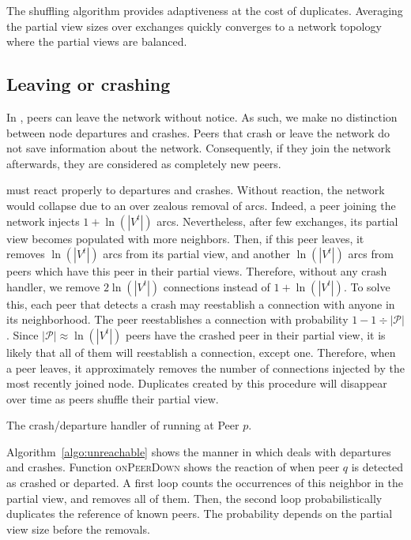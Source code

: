The shuffling algorithm provides adaptiveness at the cost of
duplicates. Averaging the partial view sizes over exchanges quickly
converges to a network topology where the partial views are balanced.

\subsection{Leaving or crashing}
\label{subsec:leaving}

In \SPRAY, peers can leave the network without notice. As such, we make no
distinction between node departures and crashes. Peers that crash or leave the
network do not save information about the network. Consequently, if they join
the network afterwards, they are considered as completely new peers.

\SPRAY must react properly to departures and crashes. Without reaction, the
network would collapse due to an over zealous removal of arcs. Indeed, a peer
joining the network injects $1+\ln(|V^t|)$ arcs. Nevertheless, after few
exchanges, its partial view becomes populated with more neighbors. Then, if this
peer leaves, it removes $\ln(|V^t|)$ arcs from its partial view, and another
$\ln(|V^t|)$ arcs from peers which have this peer in their partial
views. Therefore, without any crash handler, we remove $2\ln(|V^t|)$ connections
instead of $1+\ln(|V^t|)$. To solve this, each peer that detects a crash may
reestablish a connection with anyone in its
neighborhood. %
The peer reestablishes a connection with probability
$1-{1\div{|\mathcal{P}|}}$. Since ${|\mathcal{P}|}\approx \ln(|V^t|)$ peers have
the crashed peer in their partial view, it is likely that all of them will
reestablish a connection, except one. Therefore, when a peer leaves, it
approximately removes the number of connections injected by the most recently
joined node. Duplicates created by this procedure will disappear over time as
peers shuffle their partial view.

\begin{algorithm}[h]
  
  \caption{\label{algo:unreachable}The crash/departure handler of \SPRAY running
    at Peer $p$.}
\end{algorithm}

Algorithm~\ref{algo:unreachable} shows the manner in which \SPRAY deals with
departures and crashes.  Function \textsc{onPeerDown} shows the reaction of \SPRAY
when peer $q$ is detected as crashed or departed. A first loop counts the
occurrences of this neighbor in the partial view, and removes all of
them. Then, the second loop probabilistically duplicates the reference of 
known peers. The probability depends on the partial view size before the
removals.

